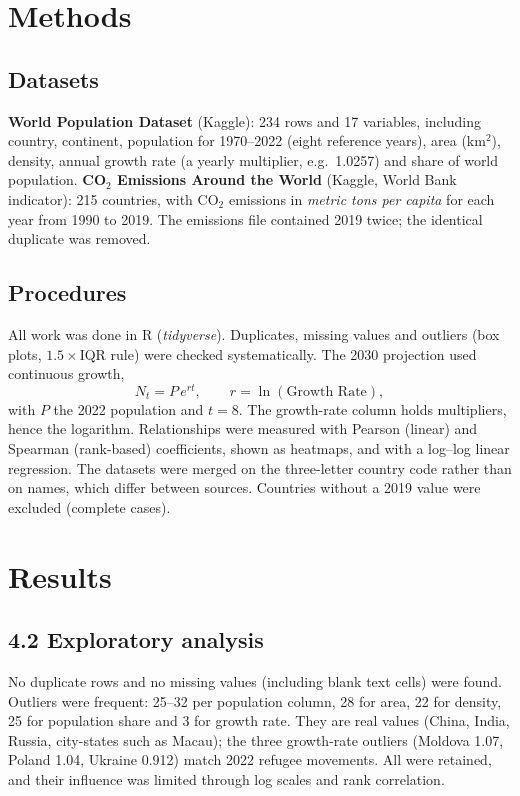 \documentclass[11pt,a4paper]{article}
\begin{document}
	\section{Methods}
	\subsection*{Datasets}
	\textbf{World Population Dataset} (Kaggle): 234 rows and 17 variables, including country, continent, population for 1970--2022 (eight reference years), area (km$^2$), density, annual growth rate (a yearly multiplier, e.g.\ 1.0257) and share of world population. \textbf{CO$_2$ Emissions Around the World} (Kaggle, World Bank indicator): 215 countries, with CO$_2$ emissions in \emph{metric tons per capita} for each year from 1990 to 2019. The emissions file contained 2019 twice; the identical duplicate was removed.
	
	\subsection*{Procedures}
	All work was done in R (\textit{tidyverse}). Duplicates, missing values and outliers (box plots, $1.5\times$IQR rule) were checked systematically. The 2030 projection used continuous growth,
	\begin{equation}
		N_t = P\,e^{rt}, \qquad r=\ln(\text{Growth Rate}),
	\end{equation}
	with $P$ the 2022 population and $t=8$. The growth-rate column holds multipliers, hence the logarithm. Relationships were measured with Pearson (linear) and Spearman (rank-based) coefficients, shown as heatmaps, and with a log--log linear regression. The datasets were merged on the three-letter country code rather than on names, which differ between sources. Countries without a 2019 value were excluded (complete cases).
	
	\section{Results}
	\subsection*{4.2 Exploratory analysis}
	No duplicate rows and no missing values (including blank text cells) were found. Outliers were frequent: 25--32 per population column, 28 for area, 22 for density, 25 for population share and 3 for growth rate. They are real values (China, India, Russia, city-states such as Macau); the three growth-rate outliers (Moldova 1.07, Poland 1.04, Ukraine 0.912) match 2022 refugee movements. All were retained, and their influence was limited through log scales and rank correlation.
	
\end{document}
